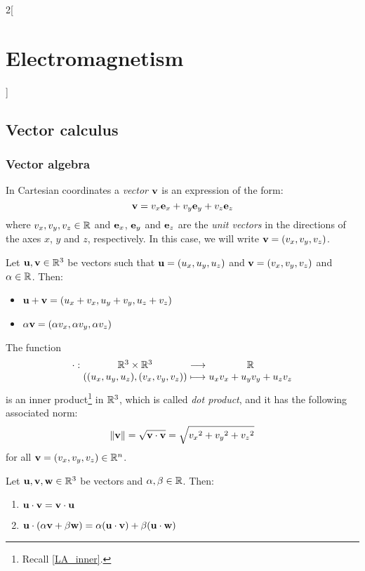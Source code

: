 \documentclass[../../../main_physics.tex]{subfiles}
\begin{document}
\renewcommand{\col}{\phy}
\begin{multicols}{2}[\section{Electromagnetism}]
  \subsection{Vector calculus}
  \subsubsection{Vector algebra}
  \begin{definition}
    In Cartesian coordinates a \emph{vector} $\boldsymbol{\mathrm{v}}$ is an expression of the form: $$\boldsymbol{\mathrm{v}}=v_x\boldsymbol{\mathrm{e}}_x+v_y\boldsymbol{\mathrm{e}}_y+v_z\boldsymbol{\mathrm{e}}_z$$
    where $v_x,v_y,v_z\in\mathbb{R}$ and $\boldsymbol{\mathrm{e}}_x$, $\boldsymbol{\mathrm{e}}_y$ and $\boldsymbol{\mathrm{e}}_z$ are the \emph{unit vectors} in the directions of the axes $x$, $y$ and $z$, respectively. In this case, we will write $\boldsymbol{\mathrm{v}}=(v_x,v_y,v_z)$.
  \end{definition}
  \begin{proposition}
    Let $\boldsymbol{\mathrm{u}},\boldsymbol{\mathrm{v}}\in\mathbb{R}^3$ be vectors such that $\boldsymbol{\mathrm{u}}=(u_x,u_y,u_z)$ and $\boldsymbol{\mathrm{v}}=(v_x,v_y,v_z)$ and $\alpha\in\mathbb{R}$. Then:
    \begin{itemize}
      \item $\boldsymbol{\mathrm{u}}+\boldsymbol{\mathrm{v}}=(u_x+v_x,u_y+v_y,u_z+v_z)$
      \item $\alpha\boldsymbol{\mathrm{v}}=(\alpha v_x,\alpha v_y,\alpha v_z)$
    \end{itemize}
  \end{proposition}
  \begin{proposition}
    The function $$\function{\cdot}{\RR^3\times\RR^3}{\RR}{((u_x,u_y,u_z),(v_x,v_y,v_z))}{u_xv_x+u_yv_y+u_zv_z}$$ is an inner product\footnote{Recall \cref{LA_inner}.} in $\mathbb{R}^3$, which is called \emph{dot product}, and it has the following associated norm: $$\|\boldsymbol{\mathrm{v}}\|=\sqrt{\boldsymbol{\mathrm{v}}\cdot\boldsymbol{\mathrm{v}}}=\sqrt{{v_x}^2+{v_y}^2+{v_z}^2}$$ for all $\boldsymbol{\mathrm{v}}=(v_x,v_y,v_z)\in\mathbb{R}^n$.
  \end{proposition}
  \begin{proposition}
    Let $\boldsymbol{\mathrm{u}},\boldsymbol{\mathrm{v}},\boldsymbol{\mathrm{w}}\in\mathbb{R}^3$ be vectors and $\alpha,\beta \in\mathbb{R}$. Then:
    \begin{enumerate}
      \item $\boldsymbol{\mathrm{u}}\cdot\boldsymbol{\mathrm{v}}=\boldsymbol{\mathrm{v}}\cdot\boldsymbol{\mathrm{u}}$
      \item $\boldsymbol{\mathrm{u}}\cdot(\alpha\boldsymbol{\mathrm{v}}+\beta\boldsymbol{\mathrm{w}})=\alpha(\boldsymbol{\mathrm{u}}\cdot\boldsymbol{\mathrm{v}})+\beta(\boldsymbol{\mathrm{u}}\cdot\boldsymbol{\mathrm{w}})$

\end{enumerate}
\end{proposition}
\end{multicols}
\end{document}
